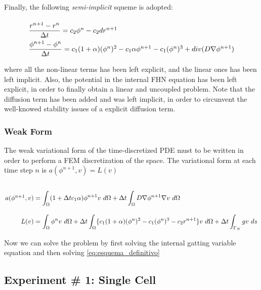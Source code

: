 Finally, the following \textsl{semi-implicit} squeme is adopted:

\begin{equation}
\arraycolsep=1.4pt\def\arraystretch{2.2}
\begin{array}{llr}
\dfrac{r^{n+1} - r^n}{\Delta t} = c_2 \phi^n - c_2 d r^{n+1} \\
\dfrac{\phi^{n+1} - \phi^n}{\Delta t} = c_1 (1 + \alpha) (\phi^n)^2 - c_1 \alpha \phi^{n+1} - c_1 (\phi^n)^3 + div(D \nabla \phi^{n+1})
\end{array} \label{eq:FHN_semi_imp}
\end{equation}

where all the non-linear terms has been left explicit, and the linear ones has been left implicit. Also, the potential in the internal FHN equation has been left explicit, in order to finally obtain a linear and uncoupled problem. Note that the diffusion term has been added and was left implicit, in order to circunvent the well-knowed stability issues of a explicit diffusion term.

\subsubsection{Weak Form}

The weak variational form of the time-discretized PDE must to be written in order to perform a FEM discretization of the space. The variational form at each time step $n$ is $a(\phi^{n + 1}, v) = L(v)$ 

\begin{equation}
\arraycolsep=1.4pt\def\arraystretch{3}
\begin{array}{rcl}
a (\phi^{n + 1}, v)& = & \displaystyle \int_{\Omega} (1 + \Delta t c_1 \alpha) \phi^{n+1} v ~d \Omega + \Delta t \int_{\Omega} D \nabla \phi^{n+1} \nabla v ~d \Omega \\
L(v)& = &\displaystyle \int_{\Omega} \phi^n v ~d \Omega + \Delta t \int_\Omega \{ c_1(1 + \alpha)(\phi^n)^2 - c_1 (\phi^n)^3 - c_2 r^{n+1} \} v~ d \Omega + \Delta t \int_{\Gamma_N} g  v ~ds 
\end{array} \label{eq:esquema_definitivo}
\end{equation}


Now we can solve the problem by first solving the internal gatting variable equation and then solving \eqref{eq:esquema_definitivo}

\subsection{Experiment \# 1: Single Cell}

